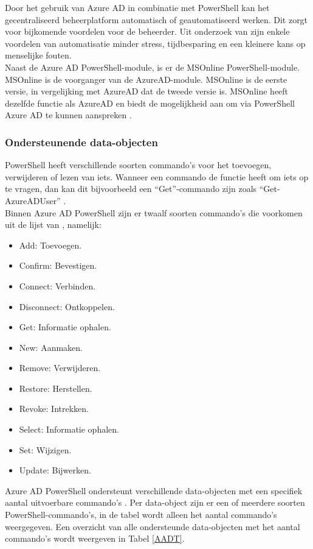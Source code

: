 Door het gebruik van Azure \ac{AD} in combinatie met PowerShell kan het gecentraliseerd beheerplatform automatisch of geautomatiseerd werken. Dit zorgt voor bijkomende voordelen voor de beheerder. Uit onderzoek van \textcite{Breton2003} zijn enkele voordelen van automatisatie minder stress, tijdbesparing en een kleinere kans op menselijke fouten. \\

Naast de Azure \ac{AD} PowerShell-module, is er de MSOnline PowerShell-module. MSOnline is de voorganger van de AzureAD-module. MSOnline is de eerste versie, in vergelijking met AzureAD dat de tweede versie is. MSOnline heeft dezelfde functie als AzureAD en biedt de mogelijkheid aan om via PowerShell Azure \ac{AD} te kunnen aanspreken \autocite{Prigent2019}.

\subsubsection{Ondersteunende data-objecten}

PowerShell heeft verschillende soorten commando's voor het toevoegen, verwijderen of lezen van iets. Wanneer een commando de functie heeft om iets op te vragen, dan kan dit bijvoorbeeld een “Get”-commando zijn zoals “Get-AzureADUser” \autocite{Microsoft2023i}. \\

Binnen Azure AD PowerShell zijn er twaalf soorten commando's die voorkomen uit de lijst van \textcite{Microsoft2023i}, namelijk:

\begin{itemize}
    \item Add: Toevoegen.
    \item Confirm: Bevestigen.
    \item Connect: Verbinden.
    \item Disconnect: Ontkoppelen.
    \item Get: Informatie ophalen.
    \item New: Aanmaken.
    \item Remove: Verwijderen.
    \item Restore: Herstellen.
    \item Revoke: Intrekken.
    \item Select: Informatie ophalen.
    \item Set: Wijzigen.
    \item Update: Bijwerken.
\end{itemize}

Azure AD PowerShell ondersteunt verschillende data-objecten met een specifiek aantal uitvoerbare commando's \autocite{Microsoft2023i}. Per data-object zijn er een of meerdere soorten PowerShell-commando's, in de tabel wordt alleen het aantal commando's weergegeven. Een overzicht van alle ondersteunde data-objecten met het aantal commando's wordt weergeven in Tabel \ref{AADT}. 

